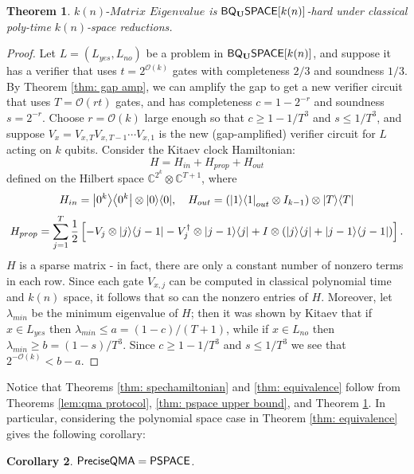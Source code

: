 \documentclass[11pt]{article}
\newtheorem{theorem}{Theorem}
\newtheorem{corollary}[theorem]{Corollary}
\theoremstyle{definition}
\theoremstyle{remark}
\newcommand\BQSPACE{{\sf{BQ_{U}SPACE}}}
\newcommand\PSPACE{{\sf{PSPACE}}}
\newcommand\QMAexp{{\sf{PreciseQMA}}}
\newcommand\spechamiltonian[1]{#1\textit{-Matrix Eigenvalue}}
\newcommand{\classfont}{\sf}
\newcommand{\Unitary}{\mathbf{U}}
\newcommand{\unitaryBQSPACE}[1]{{\classfont{BQ}_\Unitary\classfont{SPACE}}[#1]}
\newcommand\bigoh{\mathcal{O}}
\begin{document}
\begin{theorem}\label{thm: specham-hardness}
$\spechamiltonian{k(n)}$ is $\unitaryBQSPACE{k(n)}$-hard under classical poly-time $k(n)$-space reductions.
\end{theorem}
\begin{proof}
Let $L=(L_{yes},L_{no})$ be a problem in $\unitaryBQSPACE{k(n)}$, and suppose it has a verifier that uses $t=2^{\bigoh(k)}$ gates with completeness $2/3$ and soundness $1/3$. By Theorem \ref{thm: gap amp}, we can   amplify the gap to get a new verifier circuit that uses $T=\mathcal{O}(rt)$ gates, and has completeness $c=1-2^{-r}$ and soundness $s=2^{-r}$. Choose $r=\bigoh(k)$ large enough so that $c \ge 1 - 1/T^3$ and $s \le 1/T^3$, and suppose $V_x=V_{x,T}V_{x,T-1}\cdots V_{x,1}$ is the new (gap-amplified) verifier circuit for $L$ acting on $k$ qubits. Consider the Kitaev clock Hamiltonian:
\begin{equation}
H = H_{in} + H_{prop} + H_{out}
\end{equation}
defined on the Hilbert space $\mathbb{C}^{2^k} \otimes \mathbb{C}^{T+1}$, where
\begin{equation}
H_{in} = {\left\vert{0^k}\right\rangle}{\left\langle{0^k}\right\vert} \otimes {\left\vert{0}\right\rangle}{\left\langle{0}\right\vert}, \quad
H_{out} = ({\left\vert{1}\right\rangle}{\left\langle{1}\right\vert}_{out} \otimes I_{k-1}) \otimes {\left\vert{T}\right\rangle}{\left\langle{T}\right\vert}
\end{equation}
\begin{equation}
H_{prop} = \sum_{j=1}^T \frac{1}{2} \left[ - V_j \otimes {\left\vert{j}\right\rangle}{\left\langle{j-1}\right\vert} - V_j^\dagger \otimes {\left\vert{j-1}\right\rangle}{\left\langle{j}\right\vert} + I \otimes ({\left\vert{j}\right\rangle}{\left\langle{j}\right\vert} + {\left\vert{j-1}\right\rangle}{\left\langle{j-1}\right\vert}) \right].
\end{equation}
$H$ is a sparse matrix - in fact, there are only a constant number of nonzero terms in each row. Since each gate $V_{x,j}$ can be computed in classical polynomial time and $k(n)$ space, it follows that so can the nonzero entries of $H$. Moreover, let $\lambda_{min}$ be the minimum eigenvalue of $H$; then it was shown by Kitaev \cite{ksv02} that if $x \in L_{yes}$ then $\lambda_{min} \le a = (1-c)/(T+1)$, while if $x \in L_{no}$ then $\lambda_{min} \ge b = (1-s)/T^3$. Since $c \ge 1-1/T^3$ and $s \le 1/T^3$ we see that $2^{-\mathcal{O}(k)} < b-a$. 
\end{proof}
Notice that Theorems \ref{thm: spechamiltonian} and \ref{thm: equivalence} follow from Theorems \ref{lem:qma protocol}, \ref{thm: pspace upper bound}, and Theorem \ref{thm: specham-hardness}. In particular, considering the polynomial space case in Theorem \ref{thm: equivalence} gives the following corollary:
\begin{corollary} $\QMAexp=\PSPACE$. \end{corollary}
\end{document}
